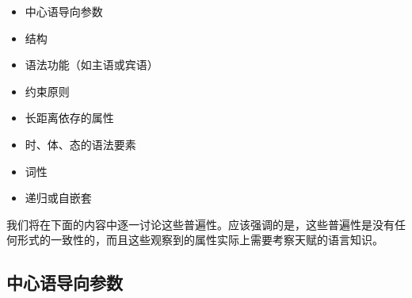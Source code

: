\begin{itemize}
\item 中心语导向参数
\item \xbarc 结构
\item 语法功能（如主语或宾语）
\item 约束原则
\item 长距离依存的属性
\item 时、体、态的语法要素
\item 词性
\item 递归或自嵌套
\end{itemize}

\noindent
我们将在下面的内容中逐一讨论这些普遍性。应该强调的是，这些普遍性是没有任何形式的一致性的，而且这些观察到的属性实际上需要考察天赋的语言知识。

\subsection{中心语导向参数}
\label{Abschnitt-Kopfstellungsparameter}

